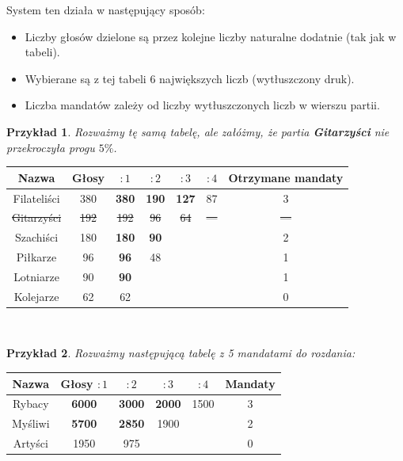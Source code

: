 \documentclass[12pt,a4paper]{article}
\theoremstyle{break}
\newtheorem{example}{Przykład}[section]
\begin{document}
System ten działa w następujący sposób:

\begin{itemize}
	\item Liczby głosów dzielone są przez kolejne liczby naturalne dodatnie (tak jak w tabeli).
	\item Wybierane są z tej tabeli 6 największych liczb (wytłuszczony druk).
	\item Liczba mandatów zależy od liczby wytłuszczonych liczb w wierszu partii.
\end{itemize}

\begin{example}
	Rozważmy tę samą tabelę, ale załóżmy, że partia \textbf{Gitarzyści} nie przekroczyła progu $5\%$.
\end{example}

\begin{tabular}{|c|c|c|c|c|c|c|}\hline
	Nazwa        & Głosy & $:1$ & $:2$ & $:3$ & $:4$ & Otrzymane mandaty\\\hline
	Filateliści  & 380   & \textbf{380} & \textbf{190} & \textbf{127} & 87   & 3\\\hline
	\sout{Gitarzyści}  & \sout{192}  & \sout{192} & \sout{96}  & \sout{64}  & \sout{---} & \sout{---} \\\hline
	Szachiści    & 180   & \textbf{180} & \textbf{90}  &       &       & 2\\\hline
	Piłkarze     & 96    & \textbf{96}  & 48    &       &       & 1\\\hline
	Lotniarze    & 90    & \textbf{90}  &       &       &       & 1\\\hline
	Kolejarze    & 62    & 62    &       &       &       & 0\\\hline
\end{tabular}\\

\begin{example}
	Rozważmy następującą tabelę z 5 mandatami do rozdania:
\end{example}

\begin{tabular}{|c|c|c|c|c|c|}\hline
	Nazwa    & Głosy $:1$ & $:2$ & $:3$ & $:4$ & Mandaty\\\hline
	Rybacy   & \textbf{6000} & \textbf{3000} & \textbf{2000} & 1500 & 3\\\hline
	Myśliwi  & \textbf{5700} & \textbf{2850} & 1900  &       & 2\\\hline
	Artyści  & 1950          & 975           &       &       & 0\\\hline
\end{tabular}\\
\end{document}
